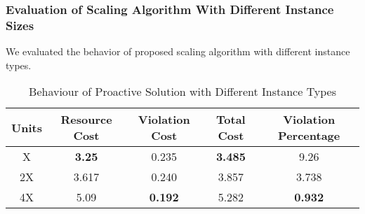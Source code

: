 \subsubsection{Evaluation of Scaling Algorithm With Different Instance Sizes}
We evaluated the behavior of proposed scaling algorithm with different instance types.  
\begin{table}
\caption{Behaviour of Proactive Solution with Different Instance Types}
\centering
\label{dif_instance}
\begin{tabular}{|c|c|c|c|c|}
\hline
Units
& Resource Cost
& Violation Cost
& Total Cost
& Violation Percentage
\\ \hline
X
&\textbf{3.25} 
&0.235
&\textbf{3.485}
&9.26
\\ \hline
2X
&3.617
&0.240
&3.857
&3.738
\\ \hline
4X
&5.09
&\textbf{0.192}
&5.282
&\textbf{0.932}
\\ \hline
\end{tabular}
\end{table}